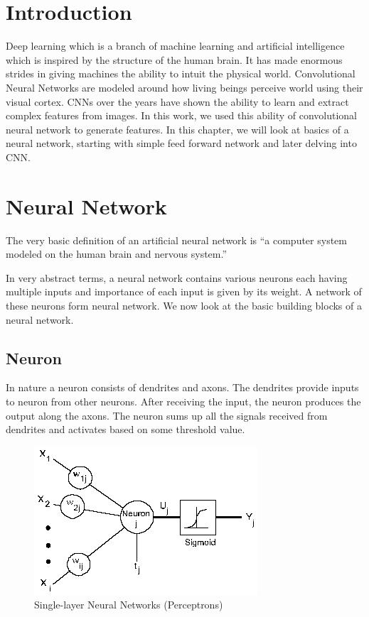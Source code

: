 \doublespacing
{} 
\label{chap:CNN}
\section{Introduction}
Deep learning which is a branch of machine learning and artificial intelligence which is  inspired by the structure of the human brain. It  has made enormous strides in giving machines the ability to intuit the physical world. Convolutional Neural Networks are modeled around how living beings perceive world using their visual cortex. CNNs over the years have shown the ability to learn and extract complex features from images. In this work, we used this ability of convolutional neural network to generate features. In this chapter, we will look at basics of a neural network, starting with simple feed forward network and later delving into CNN.


\section{Neural Network}

The very basic definition of an artificial neural network is “a computer system modeled on the human brain and nervous system.”
\par
In very abstract terms, a neural network contains various neurons each having multiple inputs and importance of each input is given by its weight. A network of these neurons form neural network. We now look at the basic building blocks of a neural network.

\subsection{Neuron}
In nature a neuron consists of dendrites and  axons. The dendrites provide inputs to neuron from other neurons. After receiving the input, the neuron produces the output along the axons. The neuron sums up all the signals received from dendrites and activates based on some threshold value. 

\begin{figure}[H]
  \centering
    \includegraphics[scale=.3, angle=0]{Files/nn2.png}
    \caption[Single-layer Neural Networks (Perceptrons)]{Single-layer Neural Networks (Perceptrons)}
    \label{fig:NNNN}
\end{figure}



